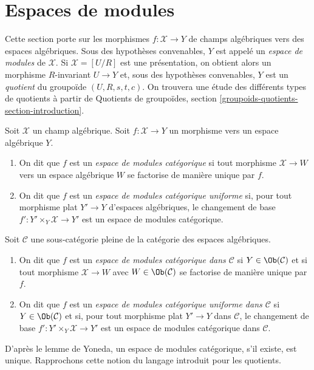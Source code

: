\section{Espaces de modules}
\label{section-moduli-spaces}

\noindent
Cette section porte sur les morphismes $f : \mathcal{X} \to Y$ de
champs algébriques vers des espaces algébriques. Sous des hypothèses convenables,
$Y$ est appelé un {\it espace de modules} de $\mathcal{X}$. Si
$\mathcal{X} = [U/R]$ est une présentation, on obtient alors un
morphisme $R$-invariant $U \to Y$ et, sous des hypothèses convenables,
$Y$ est un {\it quotient} du groupoïde $(U, R, s, t, c)$.
On trouvera une étude des différents types de quotients
à partir de
Quotients de groupoïdes, section \ref{groupoids-quotients-section-introduction}.

\begin{definition}
\label{definition-categorical-quotient}
Soit $\mathcal{X}$ un champ algébrique. Soit
$f : \mathcal{X} \to Y$ un morphisme vers un espace algébrique $Y$.
\begin{enumerate}
\item On dit que $f$ est un {\it espace de modules catégorique} si tout morphisme
$\mathcal{X} \to W$ vers un espace algébrique $W$ se factorise de manière unique par $f$.
\item On dit que $f$ est un {\it espace de modules catégorique uniforme}
si, pour tout morphisme plat $Y' \to Y$ d'espaces algébriques, le changement de base
$f' : Y' \times_Y \mathcal{X} \to Y'$ est un espace de modules catégorique.
\end{enumerate}
Soit $\mathcal{C}$ une sous-catégorie pleine de la catégorie des espaces
algébriques.
\begin{enumerate}
\item[(3)] On dit que $f$ est un {\it espace de modules catégorique dans $\mathcal{C}$}
si $Y \in \Ob(\mathcal{C})$ et si tout morphisme $\mathcal{X} \to W$ avec
$W \in \Ob(\mathcal{C})$ se factorise de manière unique par $f$.
\item[(4)] On dit que $f$ est un {\it espace de modules catégorique uniforme dans $\mathcal{C}$}
si $Y \in \Ob(\mathcal{C})$ et si, pour tout morphisme plat $Y' \to Y$ dans
$\mathcal{C}$, le changement de base $f' : Y' \times_Y \mathcal{X} \to Y'$ est un
espace de modules catégorique dans $\mathcal{C}$.
\end{enumerate}
\end{definition}

\noindent
D'après le lemme de Yoneda, un espace de modules catégorique, s'il existe, est unique.
Rapprochons cette notion du langage introduit pour les quotients.

